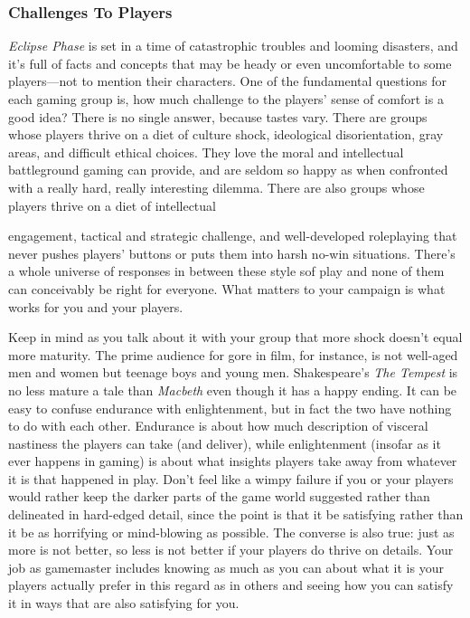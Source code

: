 \subsubsection{Challenges To Players } 

\textit{Eclipse Phase} is set in a time of catastrophic troubles and looming disasters, and it's full of facts and concepts that may be heady or even uncomfortable to some players—not to mention their characters. One of the fundamental questions for each gaming group is, how much challenge to the players' sense of comfort is a good idea? There is no single answer, because tastes vary. There are groups whose players thrive on a diet of culture shock, ideological disorientation, gray areas, and difficult ethical choices. They love the moral and intellectual battleground gaming can provide, and are seldom so happy as when confronted with a really hard, really interesting dilemma. There are also groups whose players thrive on a diet of intellectual 

engagement, tactical and strategic challenge, and well-developed roleplaying that never pushes players' buttons or puts them into harsh no-win situations. There's a whole universe of responses in between these style sof play and none of them can conceivably be right for everyone. What matters to your campaign is what works for you and your players. 

Keep in mind as you talk about it with your group that more shock doesn't equal more maturity. The prime audience for gore in film, for instance, is not well-aged men and women but teenage boys and young men. Shakespeare's \textit{The Tempest }is no less mature a tale than \textit{Macbeth }even though it has a happy ending. It can be easy to confuse endurance with enlightenment, but in fact the two have nothing to do with each other. Endurance is about how much description of visceral nastiness the players can take (and deliver), while enlightenment (insofar as it ever happens in gaming) is about what insights players take away from whatever it is that happened in play. Don't feel like a wimpy failure if you or your players would rather keep the darker parts of the game world suggested rather than delineated in hard-edged detail, since the point is that it be satisfying rather than it be as horrifying or mind-blowing as possible. The converse is also true: just as more is not better, so less is not better if your players do thrive on details. Your job as gamemaster includes knowing as much as you can about what it is your players actually prefer in this regard as in others and seeing how you can satisfy it in ways that are also satisfying for you. 

